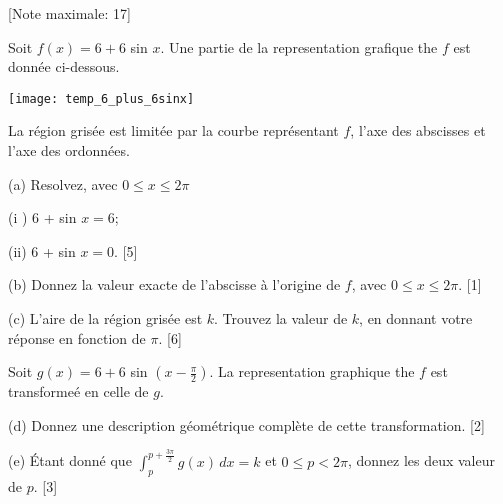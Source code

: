 \begin{question}
  \hspace*{\fill} [Note maximale: 17]\par
  \medskip
  \noindent Soit $f(x) = 6 + 6$ sin $x$. Une partie de la representation grafique the $f$ est donnée ci-dessous.\par
  \medskip
  \begin{center}
    \texttt{[image: temp\_6\_plus\_6sinx]}\par
  \end{center}
  \medskip
  \noindent La région grisée est limitée par la courbe représentant $f$, l’axe des abscisses et l’axe des ordonnées.\par
  \medskip
  (a) Resolvez, avec $0 \le x \le 2\pi$\par
  \hspace{1em} (i ) $6$ + sin $x = 6$;\par
  \hspace{1em} (ii) $6$ + sin $x = 0$.\hspace*{\fill} [5]\par
  \medskip
  (b) Donnez la valeur exacte de l’abscisse à l’origine de $f$, avec $0 \le x \le 2\pi$.\hspace*{\fill} [1]\par
  \medskip
  (c) L’aire de la région grisée est $k$. Trouvez la valeur de $k$, en donnant votre réponse en fonction de $\pi$.\hspace*{\fill} [6]\par
  \medskip
  \noindent Soit $g(x) = 6 + 6$ sin $(x - \frac{\pi}{2})$. La representation graphique the $f$ est transformeé en celle de $g$.\par
  \medskip
  (d) Donnez une description géométrique complète de cette transformation.\hspace*{\fill} [2]\par
  \medskip
  (e) Étant donné que $\int_p^{p+\frac{3\pi}{2}}g(x)\,dx =k$ et $0 \le p < 2\pi$, donnez les deux valeur de $p$.\hspace*{\fill} [3]\par
\end{question}


